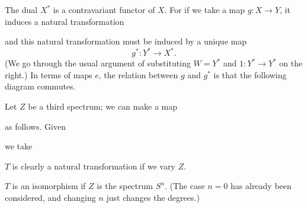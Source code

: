 \documentclass[../main]{subfiles}
\begin{document}
The dual $X^{\ast}$ is a contravariant functor of $X$. For if we take a map $g\colon X\longrightarrow Y$, it induces a natural transformation 

\begin{center}
\end{center}
and this natural transformation must be induced by a unique map \[g^{\ast}\colon Y^{\ast}\longrightarrow X^{\ast}.\](We go through the usual argument of substituting $W=Y^{\ast}$ and $1\colon Y^{\ast}\longrightarrow Y^{\ast}$ on the right.) In terms of maps $e$, the relation between $g$ and $g^{\ast}$ is that the following diagram commutes.

\begin{center}
\end{center}
Let $Z$ be a third spectrum; we can make a map
\begin{center}
\end{center}
as follows. Given
\begin{center}
\end{center}
we take
\begin{center}
\end{center}
$T$ is clearly a natural transformation if we vary $Z$.

\begin{remark}
\label{rmk:p3ch05.1}
$T$ is an isomorphism if $Z$ is the spectrum $S^n$. (The case $n=0$ has already been considered, and changing $n$ just changes the degrees.)
\end{remark}
\end{document}
